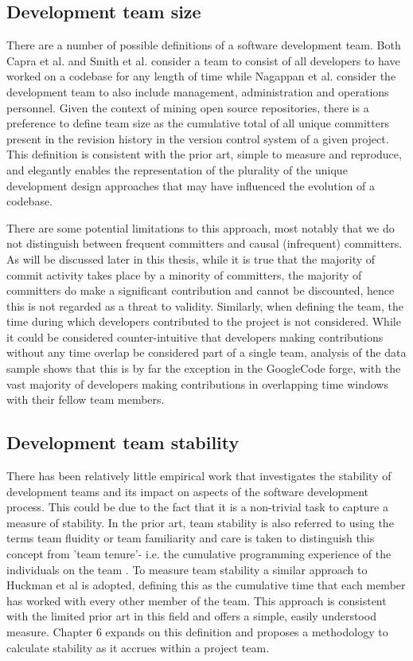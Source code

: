 \subsection{Development team size}
There are a number of possible definitions of a software development team. Both Capra et al. and Smith et al. consider a team to consist of all developers to have worked on a codebase for any length of time \citep{capra2008framework, smith2001empirical} while Nagappan et al. \citep{nagappan2008influence} consider the development team to also include management, administration and operations personnel. Given the context of mining open source repositories, there is a preference to define team size as the cumulative total of all unique committers present in the revision history in the version control system of a given project. This definition is consistent with the prior art, simple to measure and reproduce, and elegantly enables the representation of the plurality of the unique development design approaches that may have influenced the evolution of a codebase. 

There are some potential limitations to this approach, most notably that we do not distinguish between frequent committers and causal (infrequent) committers. As will be discussed later in this thesis, while it is true that the majority of commit activity takes place by a minority of committers, the majority of committers do make a significant contribution and cannot be discounted, hence this is not regarded as a threat to validity. Similarly, when defining the team, the time during which developers contributed to the project is not considered. While it could be considered counter-intuitive that developers making contributions without any time overlap be considered part of a single team, analysis of the data sample shows that this is by far the exception in the GoogleCode forge, with the vast majority of developers making contributions in overlapping time windows with their fellow team members.

\subsection{Development team stability}
There has been relatively little empirical work that investigates the stability of development teams and its impact on aspects of the software development process. This could be due to the fact that it is a non-trivial task to capture a measure of stability. In the prior art, team stability is also referred to using the terms team fluidity or team familiarity \citep{huckman2009team} and care is taken to distinguish this concept from 'team tenure'- i.e. the cumulative programming experience of the individuals on the team \citep{hackman2002leading}. To measure team stability a similar approach to Huckman et al \citep{huckman2009team} is adopted, defining this as the cumulative time that each member has worked with every other member of the team. This approach is consistent with the limited prior art in this field and offers a simple, easily understood measure. Chapter 6 expands on this definition and proposes a methodology to calculate stability as it accrues within a project team.
	
